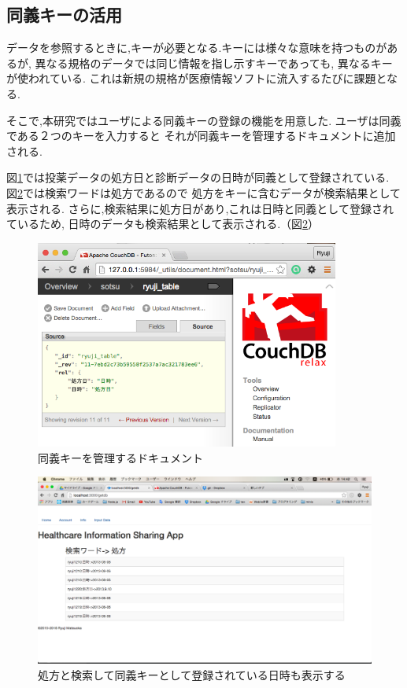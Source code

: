 \subsection{同義キーの活用}
	データを参照するときに,キーが必要となる.キーには様々な意味を持つものがあるが,
	異なる規格のデータでは同じ情報を指し示すキーであっても,
	異なるキーが使われている.
	これは新規の規格が医療情報ソフトに流入するたびに課題となる.

	そこで,本研究ではユーザによる同義キーの登録の機能を用意した.
	ユーザは同義である２つのキーを入力すると
	それが同義キーを管理するドキュメントに追加される.

	図\ref{relation}では投薬データの処方日と診断データの日時が同義として登録されている.
	図\ref{relationApp}では検索ワードは処方であるので
	処方をキーに含むデータが検索結果として表示される.
	さらに,検索結果に処方日があり,これは日時と同義として登録されているため,
	日時のデータも検索結果として表示される.（図\ref{relationApp}）

	\begin{figure}[htbp]
		\begin{center}
			\includegraphics[width=10cm, bb=0 0 609 478, clip]{./gazou/relation2.png}
		\end{center}
		\caption{同義キーを管理するドキュメント}
		\label{relation}
	\end{figure}

	\begin{figure}[htbp]
		\begin{center}
			\includegraphics[width=15cm, bb=0 0 1366 768, clip]{./gazou/relationApp2.png}
		\end{center}
		\caption{処方と検索して同義キーとして登録されている日時も表示する}
		\label{relationApp}
	\end{figure}


